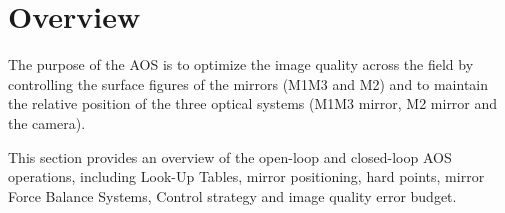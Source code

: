 \section{Overview}

The purpose of the AOS is to optimize the image quality across the field by controlling the surface figures
of the mirrors (M1M3 and M2) and to maintain the relative position of the three optical systems
(M1M3 mirror, M2 mirror and the camera).

This section provides an overview of the open-loop and closed-loop AOS operations, including
Look-Up Tables,
mirror positioning, hard points, mirror Force Balance Systems,
Control strategy and image quality error budget.







